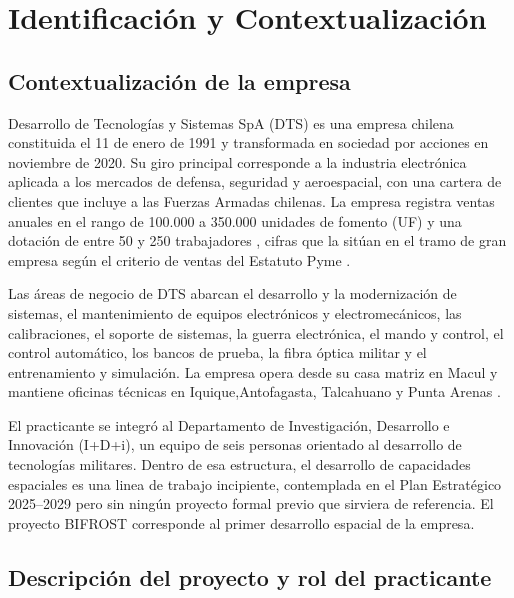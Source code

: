\section{Identificación y Contextualización}

\subsection{Contextualización de la empresa}

Desarrollo de Tecnologías y Sistemas SpA (DTS) es una empresa chilena constituida el 11 de enero de 1991 y transformada en sociedad por acciones en noviembre de 2020. Su giro principal corresponde a la industria electrónica aplicada a los mercados de defensa, seguridad y aeroespacial, con una cartera de clientes que incluye a las Fuerzas Armadas chilenas. La empresa registra ventas anuales en el rango de 100.000 a 350.000 unidades de fomento (UF) y una dotación de entre 50 y 250 trabajadores \parencite{redconecta}, cifras que la sitúan en el tramo de gran empresa según el criterio de ventas del Estatuto Pyme \parencite{minecon}.

Las áreas de negocio de DTS abarcan el desarrollo y la modernización de sistemas, el mantenimiento de equipos electrónicos y electromecánicos, las calibraciones, el soporte de sistemas, la guerra electrónica, el mando y control, el control automático, los bancos de prueba, la fibra óptica militar y el entrenamiento y simulación. La empresa opera desde su casa matriz en Macul y mantiene oficinas técnicas en Iquique,Antofagasta, Talcahuano y Punta Arenas \parencite{dts}.

El practicante se integró al Departamento de Investigación, Desarrollo e Innovación (I+D+i), un equipo de seis personas orientado al desarrollo de tecnologías militares. Dentro de esa estructura, el desarrollo de capacidades espaciales es una linea de trabajo incipiente, contemplada en el Plan Estratégico 2025--2029 pero sin ningún proyecto formal previo que sirviera de referencia. El proyecto BIFROST corresponde al primer desarrollo espacial de la empresa.


\subsection{Descripción del proyecto y rol del practicante}

